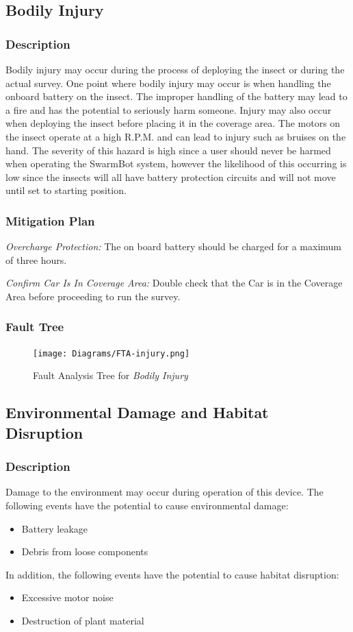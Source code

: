 \documentclass[11pt]{article}
\begin{document}
\subsection{Bodily Injury}
\subsubsection*{Description}
Bodily injury may occur during the process of deploying the insect or during the actual survey. One point where bodily injury may occur is when handling the onboard battery on the insect. The improper handling of the battery may lead to a fire and has the potential to seriously harm someone. Injury may also occur when deploying the insect before placing it in the coverage area. The motors on the insect operate at a high R.P.M. and can lead to injury such as bruises on the hand. The severity of this hazard is high since a user should never be harmed when operating the SwarmBot system, however the likelihood of this occurring is low since the insects will all have battery protection circuits and will not move until set to starting position. 

\subsubsection*{Mitigation Plan}
\textit{Overcharge Protection:} The on board battery should be charged for a maximum of three hours.

\textit{Confirm Car Is In Coverage Area:} Double check that the Car is in the Coverage Area before proceeding to run the survey. 

\subsubsection*{Fault Tree}
\begin{figure}[H]
   \centering
   \texttt{[image: Diagrams/FTA-injury.png]} %
   \caption{Fault Analysis Tree for \textit{Bodily Injury}}
   \label{fig:ft-Air}
\end{figure}

\subsection{Environmental Damage and Habitat Disruption}
\subsubsection*{Description}
Damage to the environment may occur during operation of this device. The following events have the potential to cause environmental damage:
\begin{itemize}
\item Battery leakage
\item Debris from loose components
\end{itemize}
In addition, the following events have the potential to cause habitat disruption:
\begin{itemize}
\item Excessive motor noise
\item Destruction of plant material
\end{itemize}
\end{document}
